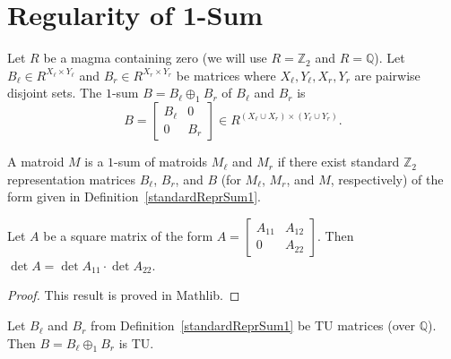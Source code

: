 \section{Regularity of 1-Sum}

\begin{definition}
    \label{standardReprSum1}
    \leanok
    Let $R$ be a magma containing zero (we will use $R = \mathbb{Z}_{2}$ and $R = \mathbb{Q}$). Let $B_{\ell} \in R^{X_{\ell} \times Y_{\ell}}$ and $B_{r} \in R^{X_{r} \times Y_{r}}$ be matrices where $X_{\ell}, Y_{\ell}, X_{r}, Y_{r}$ are pairwise disjoint sets. The $1$-sum $B = B_{\ell} \oplus_{1} B_{r}$ of $B_{\ell}$ and $B_{r}$ is
    \[
        B = \begin{bmatrix} B_{\ell} & 0 \\ 0 & B_{r} \end{bmatrix} \in R^{(X_{\ell} \cup X_{r}) \times (Y_{\ell} \cup Y_{r})}.
    \]
\end{definition}

\begin{definition}
    \label{Matroid.IsSum1of}
    \leanok
    A matroid $M$ is a $1$-sum of matroids $M_{\ell}$ and $M_{r}$ if there exist standard $\mathbb{Z}_{2}$ representation matrices $B_{\ell}$, $B_{r}$, and $B$ (for $M_{\ell}$, $M_{r}$, and $M$, respectively) of the form given in Definition~\ref{standardReprSum1}.
\end{definition}

\begin{lemma}
    \label{Matrix.det_fromBlocks_zero}
    \leanok
    Let $A$ be a square matrix of the form $A = \begin{bmatrix} A_{11} & A_{12} \\ 0 & A_{22} \end{bmatrix}$. Then $\det A = \det A_{11} \cdot \det A_{22}$.
\end{lemma}

\begin{proof}
    \leanok
    This result is proved in Mathlib.
\end{proof}

\begin{lemma}
    \label{Matrix.fromBlocks_isTotallyUnimodular}
    \leanok
    Let $B_{\ell}$ and $B_{r}$ from Definition~\ref{standardReprSum1} be TU matrices (over $\mathbb{Q}$). Then $B = B_{\ell} \oplus_{1} B_{r}$ is TU.
\end{lemma}

